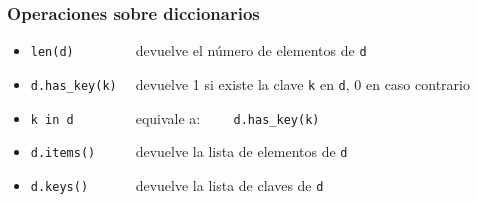 \begin{frame}[fragile]
\frametitle{Operaciones sobre diccionarios}

\begin{footnotesize}
  \begin{itemize}
  \item \verb|len(d)        | devuelve el número de elementos de \verb|d|
  \item \verb|d.has_key(k)  | devuelve 1 si existe la clave \verb|k| en
    \verb|d|, 0 en caso contrario
  \item \verb|k in d        | equivale a: \verb|    d.has_key(k)|
  \item \verb|d.items()     | devuelve la lista de elementos de \verb|d|
  \item \verb|d.keys()      | devuelve la lista de claves de \verb|d|
  \end{itemize}
\end{footnotesize}
\end{frame}






%





